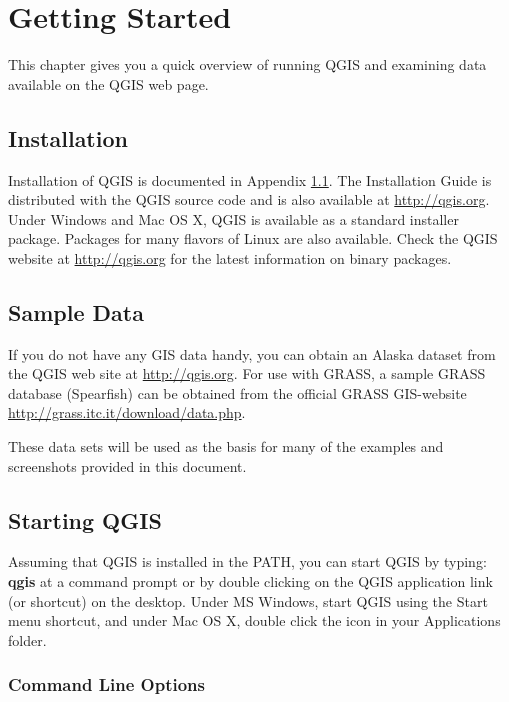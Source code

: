 \section{Getting Started}\label{label_getstarted}

This chapter gives you a quick overview of running QGIS and examining data
available on the QGIS web page.

\subsection{Installation}\label{label_installation}

Installation of QGIS is documented in Appendix \ref{label_installation}. The
Installation Guide is distributed with the QGIS source code and is also
available at \url{http://qgis.org}. Under Windows and Mac OS X, QGIS is
available as a standard installer package.
Packages for
many flavors of Linux are also available. Check the 
QGIS website at \url{http://qgis.org} for the latest information on binary
packages.


\subsection{Sample Data}\label{label_sampledata}

If you do not have any GIS data handy, you can obtain an Alaska
dataset from the QGIS web site at \url{http://qgis.org}. For use with GRASS, a sample GRASS database (Spearfish) can be obtained from the 
official GRASS GIS-website \url{http://grass.itc.it/download/data.php}.

These data sets will be used as the basis for many of the examples and screenshots 
provided in this document.

\subsection{Starting QGIS}\label{label_startinqgis}

Assuming that QGIS is installed in the PATH, you can start QGIS by typing:
\textbf{qgis}  at a command prompt or by double clicking on the QGIS
application link (or shortcut) on the desktop. Under MS Windows, start QGIS
using the Start menu shortcut, and under Mac OS X, double click the icon in
your Applications folder. 

\subsubsection{Command Line Options}
\label{label_commandline}

